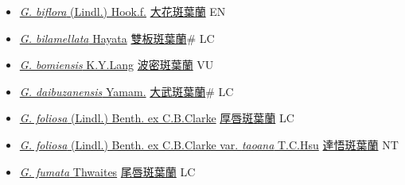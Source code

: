 \begin{itemize}
  \begin{itemize}
        \item[] \href{http://www.theplantlist.org/tpl1.1/search?q=Goodyera+biflora}{\textit{G. biflora} (Lindl.) Hook.f.}   \href{\detokenize{http://taibnet.sinica.edu.tw/chi/taibnet_species_list.php?T2=大花斑葉蘭&T2_new_value=true&fr=y}}{大花斑葉蘭} EN
        \item[] \href{http://www.theplantlist.org/tpl1.1/search?q=Goodyera+bilamellata}{\textit{G. bilamellata} Hayata}   \href{\detokenize{http://taibnet.sinica.edu.tw/chi/taibnet_species_list.php?T2=雙板斑葉蘭&T2_new_value=true&fr=y}}{雙板斑葉蘭}\# LC
        \item[] \href{http://www.theplantlist.org/tpl1.1/search?q=Goodyera+bomiensis}{\textit{G. bomiensis} K.Y.Lang}   \href{\detokenize{http://taibnet.sinica.edu.tw/chi/taibnet_species_list.php?T2=波密斑葉蘭&T2_new_value=true&fr=y}}{波密斑葉蘭} VU
        \item[] \href{http://www.theplantlist.org/tpl1.1/search?q=Goodyera+daibuzanensis}{\textit{G. daibuzanensis} Yamam.}   \href{\detokenize{http://taibnet.sinica.edu.tw/chi/taibnet_species_list.php?T2=大武斑葉蘭&T2_new_value=true&fr=y}}{大武斑葉蘭}\# LC
        \item[] \href{http://www.theplantlist.org/tpl1.1/search?q=Goodyera+foliosa}{\textit{G. foliosa} (Lindl.) Benth. ex C.B.Clarke}   \href{\detokenize{http://taibnet.sinica.edu.tw/chi/taibnet_species_list.php?T2=厚唇斑葉蘭&T2_new_value=true&fr=y}}{厚唇斑葉蘭} LC
        \item[] \href{http://www.theplantlist.org/tpl1.1/search?q=Goodyera+foliosa+var.+taoana}{\textit{G. foliosa} (Lindl.) Benth. ex C.B.Clarke var. \textit{taoana} T.C.Hsu}   \href{\detokenize{http://taibnet.sinica.edu.tw/chi/taibnet_species_list.php?T2=達悟斑葉蘭&T2_new_value=true&fr=y}}{達悟斑葉蘭} NT
        \item[] \href{http://www.theplantlist.org/tpl1.1/search?q=Goodyera+fumata}{\textit{G. fumata} Thwaites}   \href{\detokenize{http://taibnet.sinica.edu.tw/chi/taibnet_species_list.php?T2=尾唇斑葉蘭&T2_new_value=true&fr=y}}{尾唇斑葉蘭} LC

\end{itemize}
\end{itemize}
